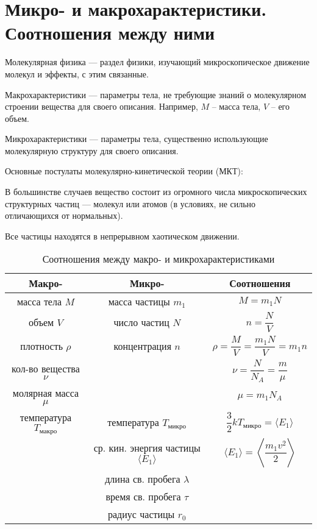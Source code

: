 \section{Микро- и макрохарактеристики. Соотношения между ними}

Молекулярная физика --- раздел физики, изучающий микроскопическое движение молекул и эффекты, с этим связанные. \par
Макрохарактеристики --- параметры тела, не требующие знаний о молекулярном строении вещества для своего описания. Например, $M$ -- масса тела, $V$ -- его объем. \par
Микрохарактеристики --- параметры тела, существенно использующие молекулярную структуру для своего описания. \par
Основные постулаты молекулярно-кинетической теории (МКТ):
\begin{post}
	 В большинстве случаев вещество состоит из огромного числа микроскопических структурных частиц --- молекул или атомов (в условиях, не сильно отличающихся от нормальных).
\end{post}
\begin{post}
	Все частицы находятся в непрерывном хаотическом движении.
\end{post}
\begin{table}[htp]
	\caption{Соотношения между макро- и микрохарактеристиками}
	\centering
	\begin{tabular}{c|c|c}
		\toprule
			Макро- 							& Микро-	 					 & Соотношения 											\\
		\midrule
			масса тела $M$					& масса частицы $m_1$			 & $M=m_1 N$											\\
			объем $V$						& число частиц $N$				 & $n=\dfrac {N}{V}$									\\
			плотность $\rho$				& концентрация $n$				 & $\rho=\dfrac {M}{V}=\dfrac{m_1 N}{V} = m_1n$			\\
			кол-во вещества $\nu$			&								 & $\nu=\dfrac {N}{N_A}=\dfrac{m}{\mu}$					\\
			молярная масса $\mu$			& 								 & $\mu=m_1 N_A$										\\
			температура $T_{\text{макро}}$	& температура $T_{\text{микро}}$ & $\dfrac{3}{2}kT_{\text{микро}}=\langle E_1 \rangle$	\\
											& ср. кин. энергия частицы $\langle E_1 \rangle$ & $\langle E_1 \rangle= \left\langle \dfrac{m_1 v^2}{2} \right\rangle$ \\
											& длина св. пробега $\lambda$	 & \\
											& время св. пробега $\tau$		 & \\
											& радиус частицы $r_0$			 & \\

		\toprule
	\end{tabular}
\end{table}
